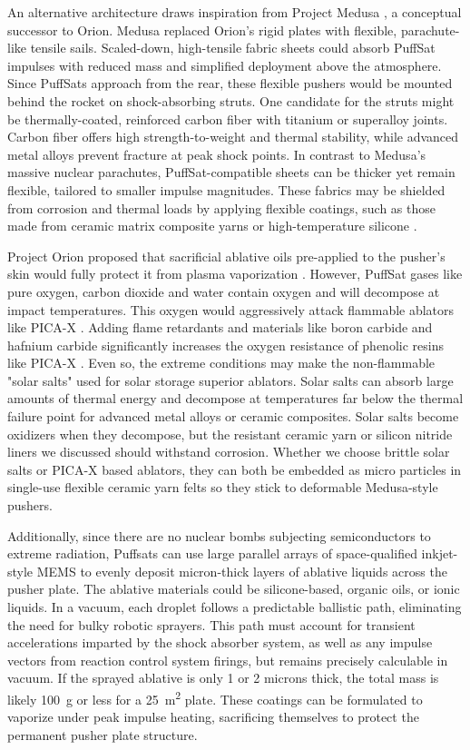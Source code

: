 \documentclass{article}
\begin{document}
{An alternative architecture draws inspiration from Project Medusa \cite{solem_medusa}, a conceptual successor to Orion. Medusa replaced Orion’s rigid plates with flexible, parachute-like tensile sails. Scaled-down, high-tensile fabric sheets could absorb PuffSat impulses with reduced mass and simplified deployment above the atmosphere. Since PuffSats approach from the rear, these flexible pushers would be mounted behind the rocket on shock-absorbing struts. One candidate for the struts might be thermally-coated, reinforced carbon fiber with titanium or superalloy joints.  Carbon fiber offers high strength-to-weight and thermal stability, while advanced metal alloys prevent fracture at peak shock points.  In contrast to Medusa’s massive nuclear parachutes, PuffSat-compatible sheets can be thicker yet remain flexible, tailored to smaller impulse magnitudes. These fabrics may be shielded from corrosion and thermal loads by applying flexible coatings, such as those made from ceramic matrix composite yarns \cite{flexible_ceramic_composites} or high-temperature silicone \cite{silicon_coatings}.

Project Orion proposed that sacrificial ablative oils pre-applied to the pusher's skin would fully protect it from plasma vaporization \cite{orion_reflections}.   However, PuffSat gases like pure oxygen, carbon dioxide and water contain oxygen and will decompose at impact temperatures.  This oxygen would aggressively attack flammable ablators like PICA-X \cite{picax_ablator}.   Adding flame retardants and materials like boron carbide and hafnium carbide significantly increases the oxygen resistance of phenolic resins like PICA-X \cite{picax_flame_resistance}. Even so, the extreme conditions may make the non-flammable "solar salts" used for solar storage superior  \cite{hitec_solar_salt} ablators. Solar salts can absorb large amounts of thermal energy and decompose at temperatures far below the thermal failure point for advanced metal alloys or ceramic composites.  Solar salts become oxidizers when they decompose, but the resistant ceramic yarn or silicon nitride liners we discussed should withstand corrosion. Whether we choose brittle solar salts or PICA-X based ablators, they can both be embedded as micro particles in single-use flexible ceramic yarn felts so they stick to deformable Medusa-style pushers. 

Additionally, since there are no nuclear bombs subjecting semiconductors to extreme radiation, Puffsats can use large parallel arrays of space-qualified inkjet-style MEMS to evenly deposit micron-thick layers of ablative liquids across the pusher plate. The ablative materials could be silicone-based, organic oils, or ionic liquids.  In a vacuum, each droplet follows a predictable ballistic path, eliminating the need for bulky robotic sprayers. This path must account for transient accelerations imparted by the shock absorber system, as well as any impulse vectors from reaction control system firings, but remains precisely calculable in vacuum.  If the sprayed ablative is only 1 or 2 microns thick, the total mass is likely \SI{100}{\gram} or less for a \SI{25}{\square\meter} plate. These coatings can be formulated to vaporize under peak impulse heating, sacrificing themselves to protect the permanent pusher plate structure.

}
\end{document}
